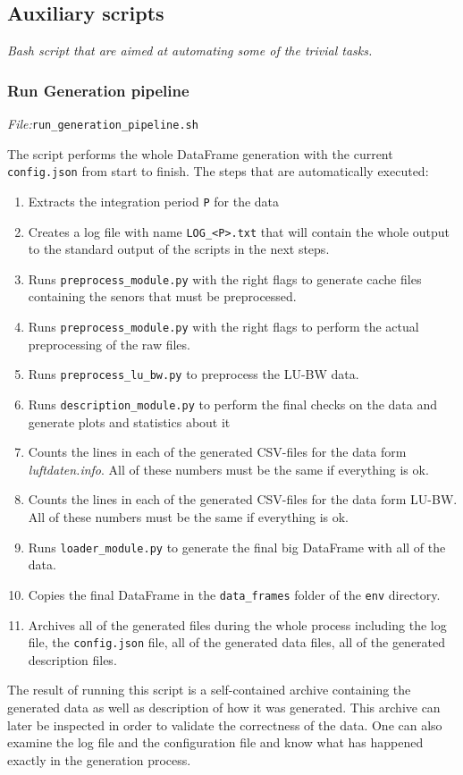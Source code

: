 \documentclass[12pt,a4paper,twoside]{scrartcl}
\numberwithin{equation}{section}
\begin{document}
\subsection{Auxiliary scripts}
\label{sec:aux-scripts}
\noindent\emph{Bash script that are aimed at automating some of the trivial tasks.} 
\subsubsection{Run Generation pipeline}
\label{sec:gen-pipe}
\noindent\emph{File:}\texttt{run\_generation\_pipeline.sh}

The script performs the whole DataFrame generation with the current \texttt{config.json} from start to finish. The steps that are automatically executed:
\begin{enumerate}
\item Extracts the integration period \texttt{P} for the data
\item Creates a log file with name \texttt{LOG\_<P>.txt} that will contain the whole output to the standard output of the scripts in the next steps.
\item Runs \texttt{preprocess\_module.py} with the right flags to generate cache files containing the senors that must be preprocessed.
\item Runs \texttt{preprocess\_module.py} with the right flags to perform the actual preprocessing of the raw files.
\item Runs \texttt{preprocess\_lu\_bw.py} to preprocess the LU-BW data.
\item Runs \texttt{description\_module.py} to perform the final checks on the data and generate plots and statistics about it
\item Counts the lines in each of the generated CSV-files for the data form \emph{luftdaten.info}. All of these numbers must be the same if everything is ok.
\item Counts the lines in each of the generated CSV-files for the data form LU-BW. All of these numbers must be the same if everything is ok.
\item Runs \texttt{loader\_module.py} to generate the final big DataFrame with all of the data.
\item Copies the final DataFrame in the \texttt{data\_frames} folder of the \texttt{env} directory.
\item Archives all of the generated files during the whole process including the log file, the \texttt{config.json} file, all of the generated data files, all of the generated description files.
\end{enumerate}
The result of running this script is a self-contained archive containing the generated data as well as description of how it was generated. This archive can later be inspected in order to validate the correctness of the data. One can also examine the log file and the configuration file and know what has happened exactly in the generation process.
\end{document}
